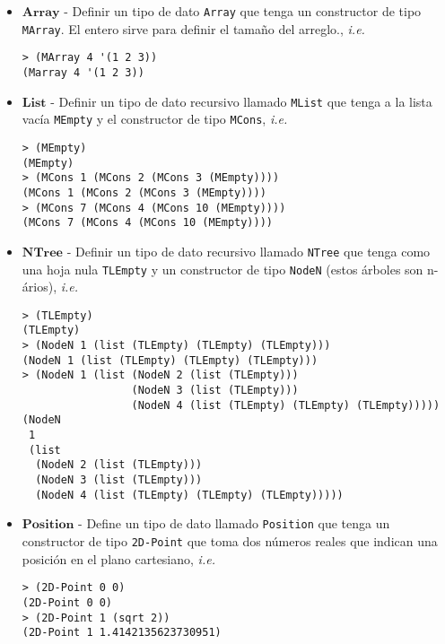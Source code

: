 \documentclass{article}
\begin{document}
\begin{itemize}
\item $\textbf{Array}$ - Definir un tipo de dato \texttt{Array}
  que tenga un constructor de tipo \texttt{MArray}. El entero sirve
  para definir el tamaño del arreglo., \textit{i.e.}
\begin{verbatim}
> (MArray 4 '(1 2 3))
(Marray 4 '(1 2 3))
\end{verbatim}

\newpage

\item $\textbf{List}$ - Definir un tipo de dato recursivo llamado
  \texttt{MList} que tenga a la lista vacía \texttt{MEmpty} y el
  constructor de tipo \texttt{MCons}, \textit{i.e.}
\begin{verbatim}
> (MEmpty)
(MEmpty)
> (MCons 1 (MCons 2 (MCons 3 (MEmpty))))
(MCons 1 (MCons 2 (MCons 3 (MEmpty))))
> (MCons 7 (MCons 4 (MCons 10 (MEmpty))))
(MCons 7 (MCons 4 (MCons 10 (MEmpty))))
\end{verbatim}

\item $\textbf{NTree}$ - Definir un tipo de dato recursivo llamado
  \texttt{NTree} que tenga como una hoja nula \texttt{TLEmpty} y un
  constructor de tipo \texttt{NodeN} (estos árboles son n-ários), \textit{i.e.}
\begin{verbatim}
> (TLEmpty)
(TLEmpty)
> (NodeN 1 (list (TLEmpty) (TLEmpty) (TLEmpty)))
(NodeN 1 (list (TLEmpty) (TLEmpty) (TLEmpty)))
> (NodeN 1 (list (NodeN 2 (list (TLEmpty))) 
                 (NodeN 3 (list (TLEmpty))) 
                 (NodeN 4 (list (TLEmpty) (TLEmpty) (TLEmpty)))))
(NodeN
 1
 (list
  (NodeN 2 (list (TLEmpty)))
  (NodeN 3 (list (TLEmpty)))
  (NodeN 4 (list (TLEmpty) (TLEmpty) (TLEmpty)))))
\end{verbatim}

\item $\textbf{Position}$ - Define un tipo de dato llamado
  \texttt{Position} que tenga un constructor de tipo \texttt{2D-Point}
  que toma dos números reales que indican una posición
  en el plano cartesiano, \textit{i.e.}
\begin{verbatim}
> (2D-Point 0 0)
(2D-Point 0 0)
> (2D-Point 1 (sqrt 2))
(2D-Point 1 1.4142135623730951)
\end{verbatim}


\end{itemize}
\end{document}
